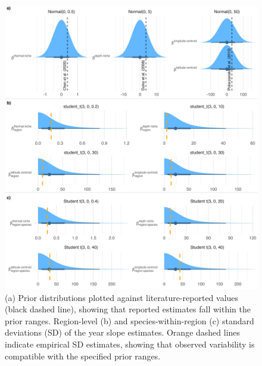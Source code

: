 \documentclass[11pt]{article}
\begin{document}
\begin{figure}[h]
    \centering
        \includegraphics[scale=0.7]{output/figures/prior_checks.png}
    \caption{(a) Prior distributions plotted against literature-reported values (black dashed line), showing that reported estimates fall within the prior ranges.
 Region-level (b) and species-within-region (c) standard deviations (SD) of the year slope estimates. Orange dashed lines indicate empirical SD estimates, showing that observed variability is compatible with the specified prior ranges.
}
    \label{fig:priors}
\end{figure}

\newpage
\end{document}
